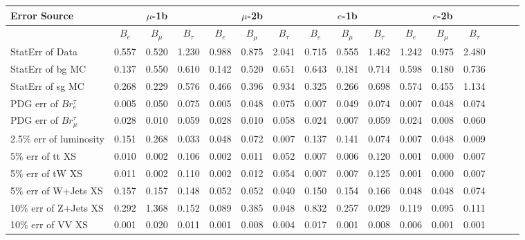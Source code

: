 \begin{sidewaystable}[p]
  \small
  \renewcommand{\arraystretch}{1.2}
  \centering

  \begin{tabular}{|l|ccc|ccc|ccc|ccc|ccc|}
  \hline
  Error Source & \multicolumn{3}{c|}{$\mu$-1b} & \multicolumn{3}{c|}{$\mu$-2b} & \multicolumn{3}{c|}{$e$-1b} & \multicolumn{3}{c|}{$e$-2b} \\
  \hline
                & $B_e$ & $B_\mu$ & $B_\tau$ & $B_e$ & $B_\mu$ & $B_\tau$ & $B_e$ & $B_\mu$ & $B_\tau$ & $B_e$ & $B_\mu$ & $B_\tau$ \\
  \hline
  StatErr of Data                            & 0.557 & 0.520 & 1.230 & 0.988 & 0.875 & 2.041 & 0.715 & 0.555 & 1.462 & 1.242 & 0.975 & 2.480 \\ 
  StatErr of bg MC                           & 0.137 & 0.550 & 0.610 & 0.142 & 0.520 & 0.651 & 0.643 & 0.181 & 0.714 & 0.598 & 0.180 & 0.736 \\ 
  StatErr of sg MC                           & 0.268 & 0.229 & 0.576 & 0.466 & 0.396 & 0.934 & 0.325 & 0.266 & 0.698 & 0.574 & 0.455 & 1.134 \\ 
  \hline
  PDG err of $Br^\tau_e$                     & 0.005 & 0.050 & 0.075 & 0.005 & 0.048 & 0.075 & 0.007 & 0.049 & 0.074 & 0.007 & 0.048 & 0.074 \\ 
  PDG err of $Br^\tau_\mu$                   & 0.028 & 0.010 & 0.059 & 0.028 & 0.010 & 0.058 & 0.024 & 0.007 & 0.059 & 0.024 & 0.008 & 0.060 \\ 
  2.5$\%$ err of luminosity                  & 0.151 & 0.268 & 0.033 & 0.048 & 0.072 & 0.007 & 0.137 & 0.141 & 0.074 & 0.007 & 0.048 & 0.009 \\ 
  5$\%$ err of tt XS                         & 0.010 & 0.002 & 0.106 & 0.002 & 0.011 & 0.052 & 0.007 & 0.006 & 0.120 & 0.001 & 0.000 & 0.007 \\ 
  5$\%$ err of tW XS                         & 0.011 & 0.002 & 0.110 & 0.002 & 0.012 & 0.054 & 0.007 & 0.007 & 0.125 & 0.001 & 0.000 & 0.007 \\ 
  5$\%$ err of W+Jets XS                     & 0.157 & 0.157 & 0.148 & 0.052 & 0.052 & 0.040 & 0.150 & 0.154 & 0.166 & 0.048 & 0.048 & 0.074 \\ 
  10$\%$ err of Z+Jets XS                    & 0.292 & 1.368 & 0.152 & 0.089 & 0.385 & 0.048 & 0.832 & 0.257 & 0.029 & 0.119 & 0.095 & 0.111 \\ 
  10$\%$ err of VV XS                        & 0.001 & 0.020 & 0.011 & 0.001 & 0.008 & 0.004 & 0.017 & 0.001 & 0.008 & 0.006 & 0.001 & 0.001 \\ 

\end{tabular}
\end{sidewaystable}
